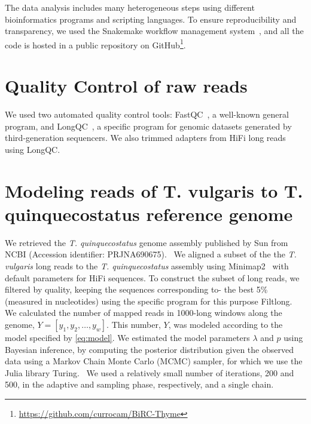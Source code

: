 The data analysis includes many heterogeneous steps using different bioinformatics programs and scripting languages. To ensure reproducibility and transparency, we used the Snakemake workflow management system~\cite{molderSustainableDataAnalysis2021}, and all the code is hosted in a public repository on GitHub\footnote{ \url{https://github.com/currocam/BiRC-Thyme}}.

\section{Quality Control of raw reads}

We used two automated quality control tools: FastQC~\cite{BabrahamBioinformaticsFastQC}, a well-known general program, and LongQC~\cite{fukasawaLongQCQualityControl2020}, a specific program for genomic datasets generated by third-generation sequencers. We also trimmed adapters from HiFi long reads using LongQC. ~\cite{fukasawaLongQCQualityControl2020}

\section{Modeling reads of T. vulgaris to T. quinquecostatus reference genome}

We retrieved the \textit{T. quinquecostatus} genome assembly published by Sun \etal from NCBI (Accession identifier: PRJNA690675).~\cite{sunChromosomelevelAssemblyAnalysis2022} We aligned a subset of the the \textit{T. vulgaris} long reads to the \textit{T. quinquecostatus} assembly using Minimap2~\cite{liMinimap2PairwiseAlignment2018} with default parameters for HiFi sequences. To construct the subset of long reads, we filtered by quality, keeping the sequences corresponding to- the best 5\% (measured in nucleotides) using the specific program for this purpose Filtlong.~\cite{wickRrwickFiltlong2023}\\



We calculated the number of mapped reads in 1000-long windows along the genome, $Y = [ y_1, y_2, \dots, y_w]$. This number, $Y$, was modeled according to the model specified by \eqref{eq:model}. We estimated the model parameters $\lambda$ and $p$ using Bayesian inference, by computing the posterior distribution given the observed data using a Markov Chain Monte Carlo (MCMC) sampler, for which we use the Julia library Turing.~\cite{DBLP:conf/aistats/GeXG18} We used a relatively small number of iterations, 200 and 500, in the adaptive and sampling phase, respectively, and a single chain. \\

